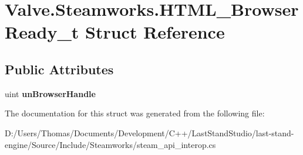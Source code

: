 \hypertarget{structValve_1_1Steamworks_1_1HTML__BrowserReady__t}{}\section{Valve.\+Steamworks.\+H\+T\+M\+L\+\_\+\+Browser\+Ready\+\_\+t Struct Reference}
\label{structValve_1_1Steamworks_1_1HTML__BrowserReady__t}
\subsection*{Public Attributes}
\begin{DoxyCompactItemize}
\item 
\hypertarget{structValve_1_1Steamworks_1_1HTML__BrowserReady__t_a85a7b232f7db70b601e3a14eef1ef787}{}uint {\bfseries un\+Browser\+Handle}\label{structValve_1_1Steamworks_1_1HTML__BrowserReady__t_a85a7b232f7db70b601e3a14eef1ef787}

\end{DoxyCompactItemize}


The documentation for this struct was generated from the following file\+:\begin{DoxyCompactItemize}
\item 
D\+:/\+Users/\+Thomas/\+Documents/\+Development/\+C++/\+Last\+Stand\+Studio/last-\/stand-\/engine/\+Source/\+Include/\+Steamworks/steam\+\_\+api\+\_\+interop.\+cs\end{DoxyCompactItemize}
